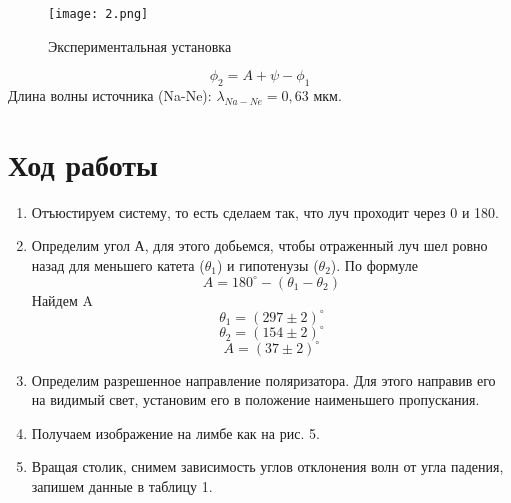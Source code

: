 \documentclass[11pt]{article}
\begin{document}
\begin{figure}[h]
\begin{center}
\texttt{[image: 2.png]}
\caption{Экспериментальная установка}
\end{center}
\end{figure}
\begin{equation}
\phi_2 = A + \psi - \phi_1
\end{equation}
Длина волны источника (Na-Ne): $\lambda_{Na-Ne} = 0,63$ мкм.
\section*{Ход работы}
\begin{enumerate}
\item Отъюстируем систему, то есть сделаем так, что луч проходит через 0 и 180.
\item Определим угол А, для этого добьемся, чтобы отраженный луч шел ровно назад для меньшего катета ($\theta_1$) и гипотенузы ($\theta_2$). По формуле 
\[A = 180^{\circ} - (\theta_1 - \theta_2)\]
Найдем A
\[\theta_1 = (297 \pm 2)^{\circ}\]
\[\theta_2 = (154 \pm 2)^{\circ}\]
\[A = (37 \pm 2)^{\circ}\]
\item Определим разрешенное направление поляризатора. Для этого направив его на видимый свет, установим его в положение наименьшего пропускания.
\item Получаем изображение на лимбе как на рис. 5.
\item Вращая столик, снимем зависимость углов отклонения волн от угла падения, запишем данные в таблицу 1.


\end{enumerate}
\end{document}
